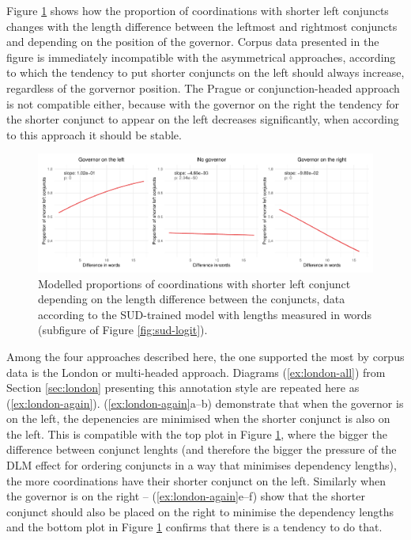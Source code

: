 
Figure \ref{idk-figure} shows how the proportion of coordinations with shorter left conjuncts changes with the length difference between the leftmost and rightmost conjuncts and depending on the position of the governor. Corpus data presented in the figure is immediately incompatible with the asymmetrical approaches, according to which the tendency to put shorter conjuncts on the left should always increase, regardless of the gorvernor position. The Prague or conjunction-headed approach is not compatible either, because with the governor on the right the tendency for the shorter conjunct to appear on the left decreases significantly, when according to this approach it should be stable. 

\begin{figure}[H]
    \includegraphics[width=\textwidth]{inputs/halfofsudmodelled.pdf}
    \caption{Modelled proportions of coordinations with shorter left conjunct depending on the length difference between the conjuncts, data according to the SUD-trained model with lengths measured in words (subfigure of Figure \ref{fig:sud-logit}).}\label{idk-figure}
\end{figure}

Among the four approaches described here, the one supported the most by corpus data is the London or multi-headed approach. Diagrams (\ref{ex:london-all}) from Section \ref{sec:london} presenting this annotation style are repeated here as (\ref{ex:london-again}). (\ref{ex:london-again}a--b) demonstrate that when the governor is on the left, the depenencies are minimised when the shorter conjunct is also on the left. This is compatible with the top plot in Figure \ref{idk-figure}, where the bigger the difference between conjunct lenghts (and therefore the bigger the pressure of the DLM effect for ordering conjuncts in a way that minimises dependency lengths), the more coordinations have their shorter conjunct on the left. Similarly when the governor is on the right -- (\ref{ex:london-again}e--f) show that the shorter conjunct should also be placed on the right to minimise the dependency lengths and the bottom plot in Figure \ref{idk-figure} confirms that there is a tendency to do that. 

